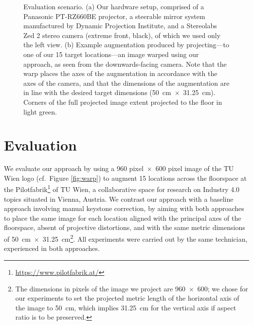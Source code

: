 \documentclass[review]{elsarticle}
\begin{document}
\begin{figure}
    \centering
    \quad
    \caption{Evaluation scenario. (a) Our hardware setup, comprised of a Panasonic PT-RZ660BE projector, a steerable mirror system manufactured by Dynamic Projection Institute, and a Stereolabs Zed 2 stereo camera (extreme front, black), of which we used only the left view. (b) Example augmentation produced by projecting---to one of our 15 target locations---an image warped using our approach, as seen from the downwards-facing camera. Note that the warp places the axes of the augmentation in accordance with the axes of the camera, and that the dimensions of the augmentation are in line with the desired target dimensions (50~cm~$\times$~31.25~cm). Corners of the full projected image extent projected to the floor in light green.}
    \label{fig:eval}
\end{figure}

\section{Evaluation}
We evaluate our approach by using a 960 pixel~$\times$~600 pixel image of the TU Wien logo (cf.\ Figure \ref{fig:warp}) to augment 15 locations across the floorspace at the Pilotfabrik\footnote{\url{https://www.pilotfabrik.at/}} of TU Wien, a collaborative space for research on Industry 4.0 topics situated in Vienna, Austria. We contrast our approach with a baseline approach involving manual keystone correction, by aiming with both approaches to place the same image for each location aligned with the principal axes of the floorspace, absent of projective distortions, and with the same metric dimensions of 50~cm~$\times$~31.25~cm\footnote{The dimensions in pixels of the image we project are 960~$\times$~600; we chose for our experiments to set the projected metric length of the horizontal axis of the image to 50~cm, which implies 31.25~cm for the vertical axis if aspect ratio is to be preserved.}. All experiments were carried out by the same technician, experienced in both approaches.
\end{document}
